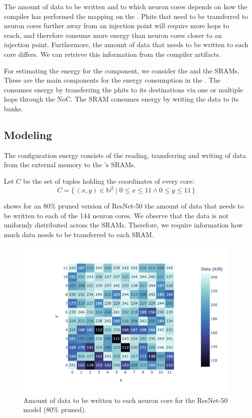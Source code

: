The amount of data to be written and to which neuron cores depends on how the compiler has performed the mapping on the \graicore{}.
Phits that need to be transferred to neuron cores further away from an injection point will require more hops to reach, and therefore consume more energy than neuron cores closer to an injection point.
Furthermore, the amount of data that needs to be written to each core differs.
We can retrieve this information from the compiler artifacts.

For estimating the energy for the \graicore{} component, we consider the \confignoc{} and the SRAMs.
These are the main components for the energy consumption in the \graicore{}.
The \confignoc{} consumes energy by transferring the phits to its destinations via one or multiple hops through the NoC.
The SRAM consumes energy by writing the data to its banks.

\subsection{Modeling}
The configuration energy consists of the reading, transferring and writing of data from the external memory to the \graicore{}'s SRAMs. 

Let $C$ be the set of tuples holding the coordinates of every core:
\begin{equation*}
    C = \{\,\left(x,y\right) \in \mathbb{N}^2 \mid 0 \leq x \leq 11 \wedge 0 \leq y \leq 11 \,\} 
\end{equation*}

 shows for an $80\%$ pruned version of ResNet-50 the amount of data that needs to be written to each of the 144 neuron cores.
We observe that the data is not uniformly distributed across the SRAMs.
Therefore, we require information how much data needs to be transferred to each SRAM.

\begin{figure}[hbtp]
    \centering
    \includegraphics[clip, trim=80 20 10 30, width=0.8\linewidth]{assets/resnet50_coredata_heatmap.png}
    \caption{Amount of data to be written to each neuron core for the ResNet-50 model (80\% pruned).}
    \label{fig:model_data_heapmap}
\end{figure}


